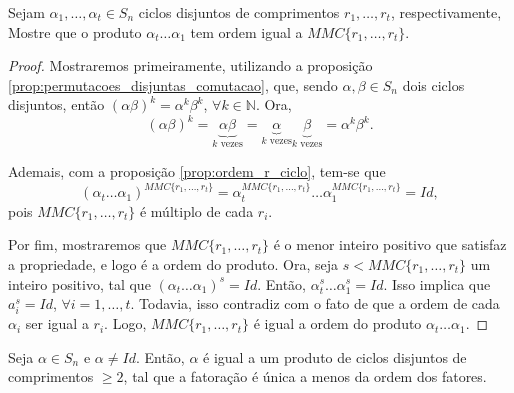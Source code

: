 \documentclass[11pt,openany]{book}
\begin{document}
\begin{proposition}
\label{prop:produto_ciclos_disjuntos_ordem_MMC}
    Sejam $\alpha_1, \dots, \alpha_t \in S_n$ ciclos disjuntos de comprimentos $r_1, \dots, r_t$, respectivamente, Mostre que o produto $\alpha_t \dots \alpha_1$ tem ordem igual a $MMC\{r_1, \dots, r_t\}$.
\end{proposition}

\begin{proof}
    Mostraremos primeiramente, utilizando a proposição \ref{prop:permutacoes_disjuntas_comutacao}, que, sendo $\alpha, \beta \in S_n$ dois ciclos disjuntos, então $(\alpha\beta)^k = \alpha^k \beta^k$, $\forall k \in \mathbb{N}$. Ora,
    \[(\alpha\beta)^k = \underbrace{\alpha\beta}_{\text{$k$ vezes}} = \underbrace{\alpha}_{\text{$k$ vezes}} \underbrace{\beta}_{\text{$k$ vezes}} = \alpha^k \beta^k.\]

    Ademais, com a proposição \ref{prop:ordem_r_ciclo}, tem-se que
    \[(\alpha_t \dots \alpha_1)^{MMC\{r_1, \dots, r_t\}} = \alpha_t^{MMC\{r_1, \dots, r_t\}} \dots \alpha_1^{MMC\{r_1, \dots, r_t\}} = Id,\]
    pois $MMC\{r_1, \dots, r_t\}$ é múltiplo de cada $r_i$.

    Por fim, mostraremos que $MMC\{r_1, \dots, r_t\}$ é o menor inteiro positivo que satisfaz a propriedade, e logo é a ordem do produto. Ora, seja $s < MMC\{r_1, \dots, r_t\}$ um inteiro positivo, tal que $(\alpha_t \dots \alpha_1)^s = Id$. Então, $\alpha_t^s \dots \alpha_1^s = Id$. Isso implica que $a_i^s = Id$, $\forall i = 1, \dots, t$. Todavia, isso contradiz com o fato de que a ordem de cada $\alpha_i$ ser igual a $r_i$. Logo, $MMC\{r_1, \dots, r_t\}$ é igual a ordem do produto $\alpha_t \dots \alpha_1$.
\end{proof}

\begin{proposition}
\label{prop:fatoracao_ciclos_disjuntos}
    Seja $\alpha \in S_n$ e $\alpha \not= Id$. Então, $\alpha$ é igual a um produto de ciclos disjuntos de comprimentos $\geq 2$, tal que a fatoração é única a menos da ordem dos fatores.
\end{proposition}
\end{document}
